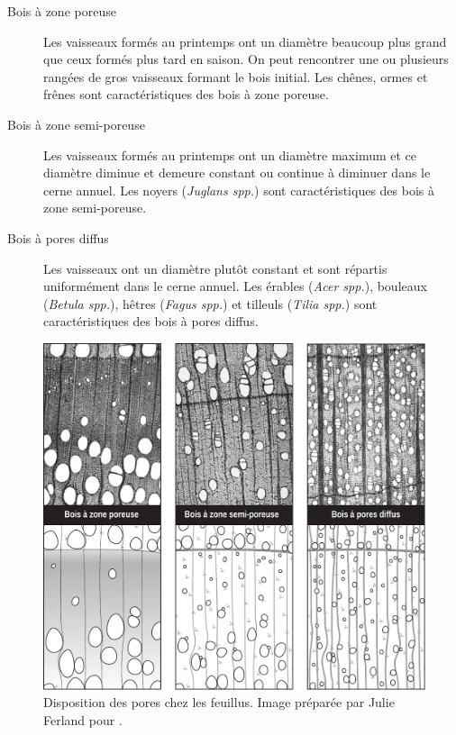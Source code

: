 \begin{description}

\item[Bois à zone poreuse] Les vaisseaux formés au printemps ont un diamètre beaucoup plus grand que ceux formés plus tard en saison. On peut rencontrer une ou plusieurs rangées de gros vaisseaux formant le bois initial.  Les chênes, ormes et frênes sont caractéristiques des bois à zone poreuse.

\item[Bois à zone semi-poreuse] Les vaisseaux formés au printemps ont un diamètre maximum et ce diamètre diminue et demeure constant ou continue à diminuer dans le cerne annuel. Les noyers (\textit{Juglans spp.}) sont caractéristiques des bois à zone semi-poreuse.

\item[Bois à pores diffus] Les vaisseaux ont un diamètre plutôt constant et sont répartis uniformément dans le cerne annuel. Les érables (\textit{Acer spp.}), bouleaux (\textit{Betula spp.}), hêtres (\textit{Fagus spp.}) et tilleuls (\textit{Tilia spp.}) sont caractéristiques des bois à pores diffus.
\end{description}

\begin{figure}[h]
\centering
\includegraphics[scale=0.6]{img/ch4_dispositon_pores}
\caption{Disposition des pores chez les feuillus. Image préparée par Julie Ferland pour \cite{achim2010dendroecologie}.}
\label{fig:dispo_pores}
\end{figure}

